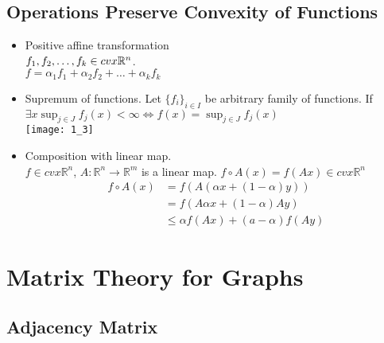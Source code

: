 \documentclass[11pt,fleqn]{book} %
\def\R{\mathbb{R}}
\begin{document}
\begin{CJK}{UTF8}{gkai}
\section{Operations Preserve Convexity of Functions}
\begin{itemize}
\item Positive affine transformation \\
$f_1,f_2,\ldots,f_k \in \space cvx \R^n$.\\
$f = \alpha_1 f_1 + \alpha_2 f_2 + \ldots + \alpha_k f_k$
\item Supremum of functions. Let $\{ f_i \}_{i \in I}$ be arbitrary family of functions. If $\exists x \sup_{j \in J} f_j(x) < \infty \Leftrightarrow f(x) = \sup_{j \in J} f_j(x) $\\
\texttt{[image: 1\_3]}
\item Composition with linear map.\\
$f \in cvx \R^n$, $A:\R^n \to \R^m$ is a linear map.
$f \circ A (x) = f(Ax) \in cvx \R^n$\\
\begin{align*}
f \circ A (x) & = f(A(\alpha x + (1-\alpha) y)) \\
& = f(A \alpha x + (1-\alpha) A y) \\
& \le \alpha f(Ax) + (a - \alpha) f(Ay)
\end{align*}
\end{itemize}

\chapter{Matrix Theory for Graphs}
\section{Adjacency Matrix}

\end{CJK}
\end{document}

